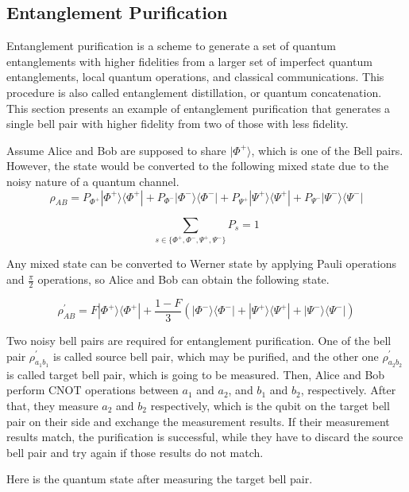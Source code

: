 \subsection{Entanglement Purification}

Entanglement purification is a scheme to generate a set of quantum entanglements with higher fidelities from a larger set of imperfect quantum entanglements, local quantum operations, and classical communications.
This procedure is also called entanglement distillation, or quantum concatenation. This section presents an example of entanglement purification that generates a single bell pair with higher fidelity from two of those with less fidelity.

Assume Alice and Bob are supposed to share $|\Phi^+\rangle$, which is one of the Bell pairs. However, the state would be converted to the following mixed state due to the noisy nature of a quantum channel.
$$ \rho_{AB} = P_{\Phi^+}|\Phi^+\rangle\langle\Phi^+| + P_{\Phi^-}|\Phi^-\rangle\langle\Phi^-| + P_{\Psi^+}|\Psi^+\rangle\langle\Psi^+| + P_{\Psi^-}|\Psi^-\rangle\langle\Psi^-|$$

$$\sum_{s \in \{\Phi^+, \Phi^-, \Psi^+, \Psi^- \}} P_{s} = 1$$

Any mixed state can be converted to Werner state by applying Pauli operations and $\frac{\pi}{2}$ operations, so Alice and Bob can obtain the following state.

$$ \rho^{'}_{AB} = F|\Phi^+\rangle\langle\Phi^+| + \frac{1-F}{3}(|\Phi^-\rangle\langle\Phi^-| + |\Psi^+\rangle\langle\Psi^+| + |\Psi^-\rangle\langle\Psi^-|)$$


Two noisy bell pairs are required for entanglement purification. One of the bell pair $\rho^{'}_{a_1 b_1}$ is called source bell pair, which may be purified, and the other one $\rho^{'}_{a_2 b_2}$  is called target bell pair, which is going to be measured. 
Then, Alice and Bob perform CNOT operations between $a_1$ and $a_2$, and $b_1$ and $b_2$, respectively.
After that, they measure $a_2$ and $b_2$ respectively, which is the qubit on the target bell pair on their side and exchange the measurement results. 
If their measurement results match, the purification is successful, while they have to discard the source bell pair and try again if those results do not match.

Here is the quantum state after measuring the target bell pair.

